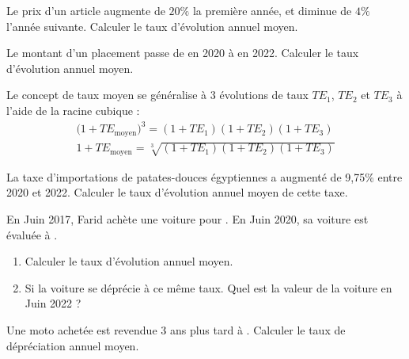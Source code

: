 \documentclass[main.tex]{subfiles}
\begin{document}
\begin{exercise}\hfill 
	
	\noindent	 Le prix d'un article  augmente de $20\%$ la première année, et diminue de $4\%$ l'année suivante. Calculer le taux d'évolution annuel moyen.
\end{exercise}  
\begin{exercise} \hfill 
	
	\noindent Le montant d'un placement passe de  en 2020 à    en 2022. Calculer le taux d'évolution annuel moyen.
\end{exercise} 
\begin{eBox} 
Le concept de taux moyen se généralise à 3 évolutions de taux $TE_1$, $TE_2$ et $TE_3$ à l'aide de la racine cubique :
\setlength{\abovedisplayskip}{3pt} 
\setlength{\belowdisplayskip}{3pt} 
\begin{gather*} 
	\big(1+TE_{\text{moyen}}\big)^3   = (1+TE_1 )   (1+TE_2) (1+TE_3)\\
	1+TE_{\text{moyen}}=\sqrt[3]{ (1+TE_1 )   (1+TE_2)  (1+TE_3)}
\end{gather*}
\end{eBox} 
\begin{exercise} \hfill 
	
	\noindent La taxe d'importations de patates-douces égyptiennes a augmenté de 9,75\% entre 2020 et 2022. Calculer le taux d'évolution annuel moyen de cette taxe.  
\end{exercise} 
\begin{exercise}\hfill 
	
	En Juin 2017, Farid achète une voiture pour . En Juin 2020, sa voiture est évaluée à .
	\begin{enumerate}[label={\alph*)},leftmargin=*] 
		\item Calculer le taux d'évolution annuel moyen.
		\item Si la voiture se déprécie à ce même taux. Quel est la valeur de la voiture en Juin 2022 ?
	\end{enumerate} 
\end{exercise}

\begin{exercise}\hfill 
	
	\noindent	Une moto achetée  est revendue 3 ans plus tard à . Calculer le taux de dépréciation annuel moyen.
\end{exercise}
\end{document}
